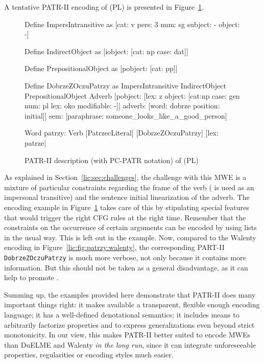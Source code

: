 \documentclass[output=paper
,modfonts
,nonflat
,biblatexbackend=biber
]{langsci/langscibook}
\begin{document}
A tentative PATR-II encoding of (PL)  is presented in Figure~\ref{lic:fig:patr:polish}.
\begin{figure}[p]
  \begin{patr-listing}
Define ImpersIntransitive as
    [cat: v
     pers: 3 
     num: sg
     subject: -
     object: -]

Define IndirectObject as
    [iobject: [cat: np
               case: dat]]

Define PrepositionalObject as
    [pobject: [cat: pp]]
    
Define DobrzeZOczuPatrzy as
    ImpersIntransitive
    IndirectObject
    PrepositionalObject
    Adverb
    [pobject: [lex: z
               object: [cat:np
                        case: gen
                        num: pl
                        lex: oko
                        modifiable: -]]
     adverb: [word: dobrze
              position: initial]]
     sem: [paraphrase: someone_looks_like_a_good_person]
    
Word patrzy:
    Verb
    {[PatrzecLiteral] [DobrzeZOczuPatrzy]}
    [lex: patrze|%
  \end{patr-listing}
  \caption{PATR-II description (with PC-PATR notation) of (PL) }
  \label{lic:fig:patr:polish}
\end{figure}
As explained in Section~\ref{lic:sec:challenges}, the challenge with this MWE is a mixture of particular constraints regarding the  frame of the verb ( is used as an impersonal transitive) and the sentence initial linearization of the adverb. The encoding example in Figure~\ref{lic:fig:patr:polish} takes care of this by stipulating special features that would trigger the right CFG rules at the right time. Remember that the constraints on the occurrence of certain arguments can be encoded by using  lists in the usual way. This is left out in the example. Now, compared to the  Walenty encoding in Figure~\ref{lic:fig:patrzy:walenty}, the corresponding PART-II  \texttt{DobrzeZOczuPatrzy} is much more verbose, not only because it contains more information. But this should not be taken as a general disadvantage, as it can help to promote .  

Summing up, the examples provided here demonstrate that PATR-II does many important things right: it makes available a transparent, flexible enough encoding language; it has a well-defined denotational semantics; it includes means to arbitrarily factorize properties and to express generalizations even beyond strict monotonicity. In our view, this makes PATR-II better suited to encode MWEs than DuELME and Walenty \textit{in the long run}, since it can integrate unforeseeable properties, regularities or encoding styles much easier.
\end{document}
